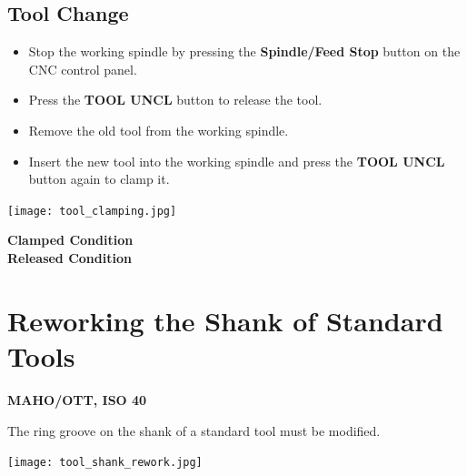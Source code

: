 \vspace{0.5cm}

\subsection{Tool Change} \footnotemark


\begin{itemize}
    \item Stop the working spindle by pressing the \textbf{Spindle/Feed Stop} button on the CNC control panel.
    \item Press the \textbf{TOOL UNCL} button to release the tool.
    \item Remove the old tool from the working spindle.
    \item Insert the new tool into the working spindle and press the \textbf{TOOL UNCL} button again to clamp it.
\end{itemize}


\vspace{0.5cm}

\begin{minipage}{0.6\textwidth}
    \centering
    \texttt{[image: tool\_clamping.jpg]}
\end{minipage}%
\begin{minipage}{0.4\textwidth}
   \textbf{Clamped Condition}
    \vspace{3.2cm}\\
   \textbf{Released Condition}
\end{minipage}

\section{Reworking the Shank of Standard Tools}

\textbf{MAHO/OTT, ISO 40}

\vspace{.5cm}

\noindent The ring groove on the shank of a standard tool must be modified.

\vspace{0.5cm}

\begin{minipage}{\textwidth}
    \centering
    \texttt{[image: tool\_shank\_rework.jpg]}
\end{minipage}

